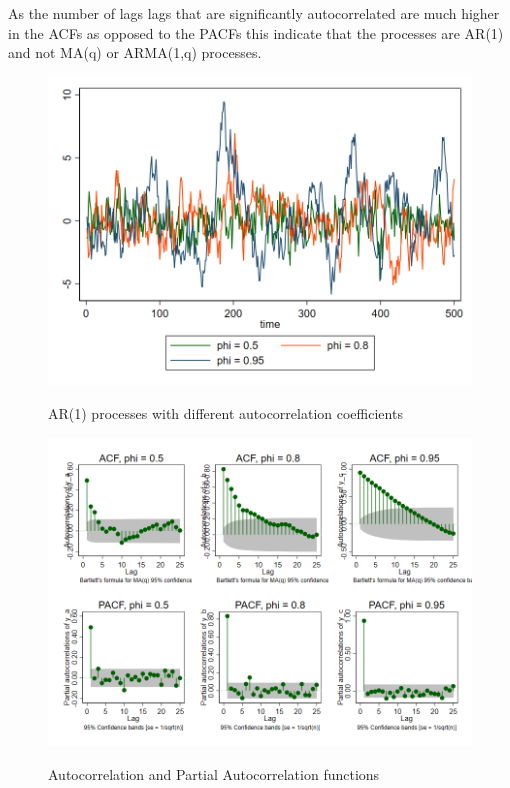As the number of lags lags that are significantly autocorrelated are much higher in the ACFs as opposed to the PACFs this indicate that the processes are AR(1) and not MA(q) or ARMA(1,q) processes.
\begin{figure}[H]
  \caption{AR(1) processes with different autocorrelation coefficients}
  \includegraphics[width= \textwidth]{03_figures/fig2b}
  \label{fig:ar1}
  \vspace{-1cm}
\end{figure}
\begin{figure}[H]
  \caption{Autocorrelation and Partial Autocorrelation functions}
  \includegraphics[width= \textwidth]{03_figures/fig2b_ac}
  \label{fig:ar1_acf}
  \vspace{-1cm}
\end{figure}
